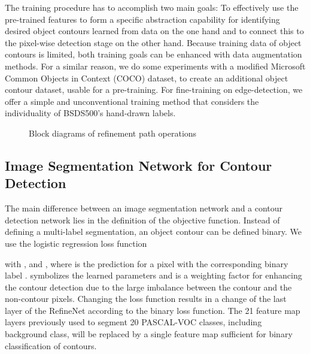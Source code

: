 \documentclass[runningheads]{llncs}
\begin{document}
The training procedure has to accomplish two main goals: To effectively use the pre-trained features to form a specific abstraction capability for identifying desired object contours learned from data on the one hand and to connect this to the pixel-wise detection stage on the other hand. Because training data of object contours is limited, both training goals can be enhanced with data augmentation methods. For a similar reason, we do some experiments with a modified Microsoft Common Objects in Context (COCO) \cite{coco} dataset, to create an additional object contour dataset, usable for a pre-training. For fine-training on edge-detection, we offer a simple and unconventional training method that considers the individuality of BSDS500's hand-drawn labels.
\begin{figure}[]
\centering
{} \quad
   \quad
   \quad
  \caption{Block diagrams of refinement path operations\label{fig:blocks}}
\end{figure}
\subsection{Image Segmentation Network for Contour Detection}
The main difference between an image segmentation network and a contour detection network lies in the definition of the objective function. Instead of defining a multi-label segmentation, an object contour can be defined binary. We use the logistic regression loss function

with ,  and , where  is the prediction for a pixel  with the corresponding binary label .   symbolizes the learned parameters and  is a weighting factor for enhancing the contour detection due to the large imbalance between the contour and the non-contour pixels. Changing the loss function results in a change of the last layer of the RefineNet according to the binary loss function. The 21 feature map layers previously used to segment 20 PASCAL-VOC classes, including background class, will be replaced by a single feature map sufficient for binary classification of contours.
\end{document}
